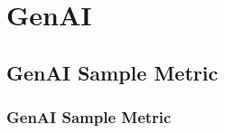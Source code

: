 \chapter{GenAI}


\clearpage
\thispagestyle{genaistyle}
\section{GenAI Sample Metric}
\subsection{GenAI Sample Metric}